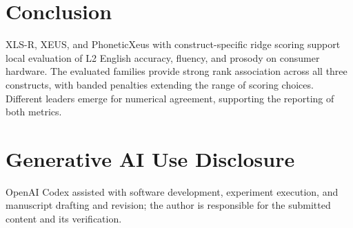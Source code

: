 \documentclass[cameraready]{Interspeech}
\begin{document}
\section{Conclusion}
XLS-R, XEUS, and PhoneticXeus with construct-specific ridge scoring support local evaluation of L2 English accuracy, fluency, and prosody on consumer hardware. The evaluated families provide strong rank association across all three constructs, with banded penalties extending the range of scoring choices. Different leaders emerge for numerical agreement, supporting the reporting of both metrics.

\section{Generative AI Use Disclosure}
OpenAI Codex assisted with software development, experiment execution, and manuscript drafting and revision; the author is responsible for the submitted content and its verification.
\end{document}
